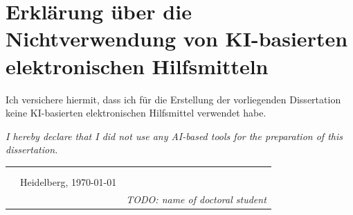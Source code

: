 \chapter*{Erklärung über die Nichtverwendung von KI-basierten elektronischen Hilfsmitteln}

Ich versichere hiermit, dass ich für die Erstellung der vorliegenden Dissertation keine KI-basierten elektronischen Hilfsmittel verwendet habe.

\emph{\small\color{dkfzgray2} I hereby declare that I did not use any AI-based tools for the preparation of this dissertation.}



\begin{tabular}{p{3cm}p{5cm}p{4cm}}
      &  & \\
      & & \\
      &Heidelberg, \today & \hrulefill\\
      & & \textit{TODO: name of doctoral student}
\end{tabular}
